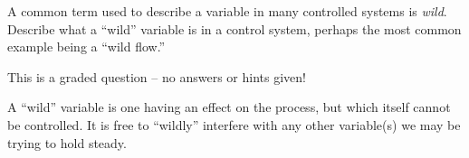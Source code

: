 

A common term used to describe a variable in many controlled systems is {\it wild}.  Describe what a ``wild'' variable is in a control system, perhaps the most common example being a ``wild flow.''

\vfil

\eject






This is a graded question -- no answers or hints given!







A ``wild'' variable is one having an effect on the process, but which itself cannot be controlled.  It is free to ``wildly'' interfere with any other variable(s) we may be trying to hold steady.




